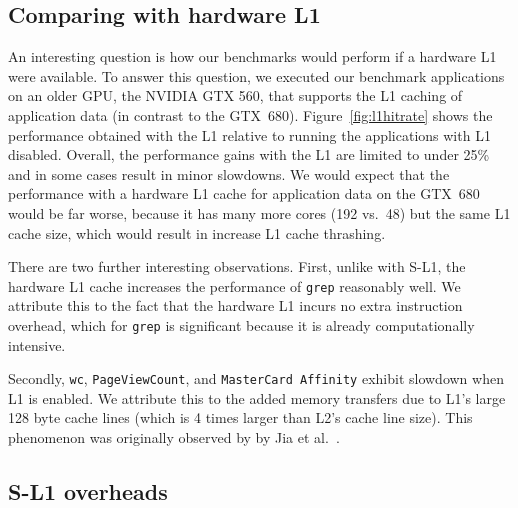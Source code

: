 

\subsection{Comparing with hardware L1}
An interesting question is how our benchmarks would perform if a hardware L1 were available.
To answer this question, we executed our benchmark applications on an older GPU, the NVIDIA GTX 560,
that supports the L1 caching of application data (in contrast to the GTX~680).
Figure~\ref{fig:l1hitrate} shows the performance obtained with the L1 relative to running the
applications with L1 disabled. Overall, the performance gains with the L1 are limited to under 25\%
and in some cases result in minor slowdowns. We would expect that the performance with a hardware
L1 cache for application data on the GTX~680 would be far worse, because it has many more cores (192
vs.\ 48) but the same L1 cache size, which would result in increase L1 cache thrashing.


There are two further interesting observations.
First, unlike with S-L1, the hardware L1 cache increases the performance of \texttt{grep} reasonably well. 
We attribute this to the fact that the hardware L1 incurs no extra instruction overhead, which for \texttt{grep} is significant because it is already computationally intensive. 

Secondly, \texttt{wc},  \texttt{PageViewCount}, and \texttt{MasterCard Affinity} exhibit slowdown when L1 is enabled. 
We attribute this to the added memory transfers due to L1's large 128 byte cache lines (which is 4 times larger than L2's cache line size).
This phenomenon was originally observed by by Jia et al.~\cite{jia2012characterizing}.


\subsection{S-L1 overheads}

